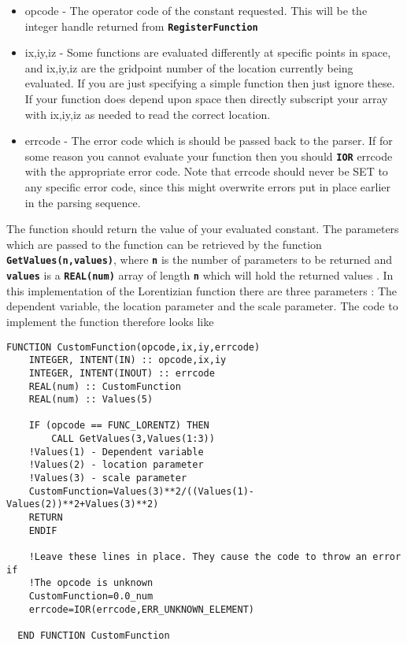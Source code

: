 \documentclass[12pt]{article}
\newcommand{\simpleboxverbatim}{\begin{Verbatim}[obeytabs=true,frame=single,
  framerule=0.5mm,rulecolor=\color{warwickmid}]}
\newcommand{\inlinecode}[1]{{\color{warwickred} \bf\texttt{#1}}}
\begin{document}
\begin{itemize}
\item opcode - The operator code of the constant requested. This will be the
  integer handle returned from \inlinecode {RegisterFunction}
\item ix,iy,iz - Some functions are evaluated differently at specific points
  in space, and ix,iy,iz are the gridpoint number of the location currently
  being evaluated. If you are just specifying a simple function then just
  ignore these. If your function does depend upon space then directly
  subscript your array with ix,iy,iz as needed to read the correct location.
\item errcode - The error code which is should be passed back to the
  parser. If for some reason you cannot evaluate your function then you should
  \inlinecode{IOR} errcode with the appropriate error code. Note that errcode
  should never be SET to any specific error code, since this might overwrite
  errors put in place earlier in the parsing sequence.
\end{itemize}

The function should return the value of your evaluated constant. The
parameters which are passed to the function can be retrieved by the function
\inlinecode {GetValues(n,values)}, where \inlinecode {n} is the number of
parameters to be returned and \inlinecode{values} is a \inlinecode{REAL(num)}
array of length \inlinecode{n} which will hold the returned values .  In this
implementation of the Lorentizian function there are three parameters : The
dependent variable, the location parameter and the scale parameter. The code
to implement the function therefore looks like

\simpleboxverbatim
  FUNCTION CustomFunction(opcode,ix,iy,errcode)
    INTEGER, INTENT(IN) :: opcode,ix,iy
    INTEGER, INTENT(INOUT) :: errcode
    REAL(num) :: CustomFunction
    REAL(num) :: Values(5)

    IF (opcode == FUNC_LORENTZ) THEN
    	CALL GetValues(3,Values(1:3))
	!Values(1) - Dependent variable
	!Values(2) - location parameter
	!Values(3) - scale parameter
	CustomFunction=Values(3)**2/((Values(1)-Values(2))**2+Values(3)**2)
	RETURN
    ENDIF

    !Leave these lines in place. They cause the code to throw an error if
    !The opcode is unknown
    CustomFunction=0.0_num
    errcode=IOR(errcode,ERR_UNKNOWN_ELEMENT)

  END FUNCTION CustomFunction
\end{Verbatim}
\end{document}

